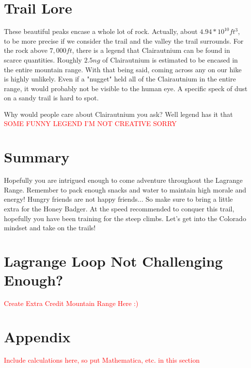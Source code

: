 \documentclass[12pt]{article}   %
\theoremstyle{definition}
\numberwithin{equation}{section}
\begin{document}
\section{Trail Lore} \label{APPM2350proj02sec05}

\quad These beautiful peaks encase a whole lot of rock. Actually, about $4.94*10^{10}ft^3$, to be more precise if we consider the trail and the valley the trail surrounds. For the rock above $7,000ft$, there is a legend that Clairautnium can be found in scarce quantities. Roughly $2.5ng$ of Clairautnium is estimated to be encased in the entire mountain range. With that being said, coming across any on our hike is highly unlikely. Even if a "nugget" held all of the Clairautnium in the entire range, it would probably not be visible to the human eye. A specific speck of dust on a sandy trail is hard to spot.

\quad Why would people care about Clairautnium you ask? Well legend has it that \textcolor{red}{SOME FUNNY LEGEND I'M NOT CREATIVE SORRY}
\section{Summary} \label{APPM2350proj02sec06}

\quad Hopefully you are intrigued enough to come adventure throughout the Lagrange Range. Remember to pack enough snacks and water to maintain high morale and energy! Hungry friends are not happy friends... So make sure to bring a little extra for the Honey Badger. At the speed recommended to conquer this trail, hopefully you have been training for the steep climbs. Let's get into the Colorado mindset and take on the trails!

\section{Lagrange Loop Not Challenging Enough?} \label{APPM2350proj02sec07}

\textcolor{red}{Create Extra Credit Mountain Range Here :)}

\section{Appendix} \label{APPM2350proj02sec08}

\textcolor{red}{Include calculations here, so put Mathematica, etc. in this section}

\end{document}
